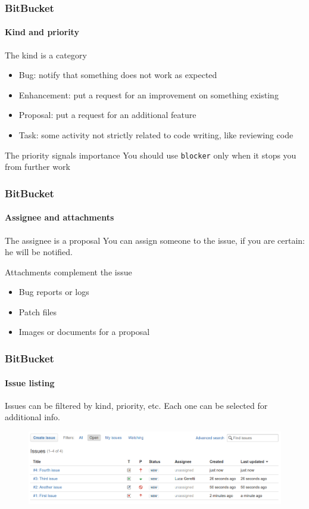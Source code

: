 \begin{frame}
\frametitle{BitBucket}
\framesubtitle{Kind and priority}

\begin{block}{The kind is a category}
\begin{itemize}
\item Bug: notify that something does not work as expected
\item Enhancement: put a request for an improvement on something existing
\item Proposal: put a request for an additional feature
\item Task: some activity not strictly related to code writing, like reviewing code
\end{itemize}
\end{block}

\begin{block}{The priority signals importance}
You should use \texttt{blocker} only when it stops you from further work
\end{block}

\end{frame}

\begin{frame}
\frametitle{BitBucket}
\framesubtitle{Assignee and attachments}

\begin{block}{The assignee is a proposal}
You can assign someone to the issue, if you are certain: he will be notified.
\end{block}

\begin{block}{Attachments complement the issue}
\begin{itemize}
\item Bug reports or logs
\item Patch files
\item Images or documents for a proposal
\end{itemize}
\end{block}

\end{frame}

\begin{frame}
\frametitle{BitBucket}
\framesubtitle{Issue listing}

Issues can be filtered by kind, priority, etc. Each one can be selected for additional info.

\bigskip

\begin{figure}
\includegraphics[width=1.0\textwidth]{lecture04/img/issueselection.png}
\end{figure}

\end{frame}

